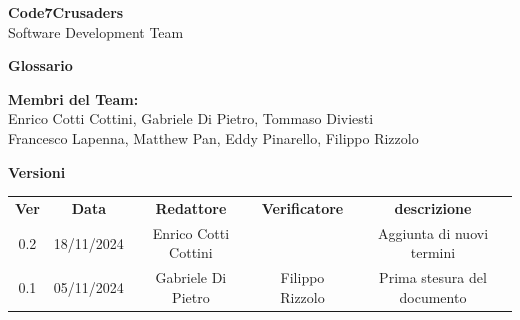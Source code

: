 \documentclass{article}
\begin{document}
\begin{titlepage}
    {\Huge \textbf{Code7Crusaders}}\\
    \vspace{0.5cm}
    {\Large Software Development Team}\\
    \vspace{2cm}
    
    \large \textbf{Glossario}
    \vspace{3.9cm}

    \textbf{Membri del Team:}\\
    Enrico Cotti Cottini, Gabriele Di Pietro, Tommaso Diviesti \\
    Francesco Lapenna, Matthew Pan, Eddy Pinarello, Filippo Rizzolo \\
    \vspace{0.5cm}
    
    \vspace{1cm}
\end{titlepage}



\newpage
\begin{center}
    \textbf{Versioni}
    \\
    \vspace{0.3cm}
    \begin{tabular}{|c|c|c|c|c|}
        \hline
        \textbf{Ver} & \textbf{Data} & \textbf{Redattore} & \textbf{Verificatore} & \textbf{descrizione}\\
        0.2 & 18/11/2024 & Enrico Cotti Cottini &  & Aggiunta di nuovi termini \\
        \hline
        0.1 & 05/11/2024 & Gabriele Di Pietro & Filippo Rizzolo & Prima stesura del documento \\
        \hline
    \end{tabular}
\end{center}

\newpage
\tableofcontents
\newpage



\end{document}
